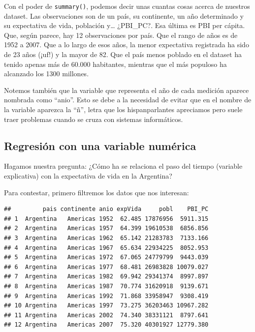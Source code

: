 \documentclass[spanish,]{book}
\newenvironment{Shaded}{\begin{snugshade}}{\end{snugshade}}
\newcommand{\KeywordTok}[1]{\textcolor[rgb]{0.13,0.29,0.53}{\textbf{#1}}}
\newcommand{\NormalTok}[1]{#1}
\newcommand{\OperatorTok}[1]{\textcolor[rgb]{0.81,0.36,0.00}{\textbf{#1}}}
\newcommand{\StringTok}[1]{\textcolor[rgb]{0.31,0.60,0.02}{#1}}
\begin{document}
Con el poder de \texttt{summary()}, podemos decir unas cuantas cosas acerca de nuestros dataset. Las observaciones son de un país, su continente, un año determinado y su expectativa de vida, población y\ldots{} ¿PBI\_PC?. Esa última es PBI per cápita. Que, según parece, hay 12 observaciones por país. Que el rango de años es de 1952 a 2007. Que a lo largo de esos años, la menor expectativa registrada ha sido de 23 años (¡uf!) y la mayor de 82. Que el país menos poblado en el dataset ha tenido apenas más de 60.000 habitantes, mientras que el más populoso ha alcanzado los 1300 millones.

Notemos también que la variable que representa el año de cada medición aparece nombrada como ``anio''. Esto se debe a la necesidad de evitar que en el nombre de la variable aparezca la ``ñ'', letra que los hispanparlantes apreciamos pero suele traer problemas cuando se cruza con sistemas informáticos.

\hypertarget{regresiuxf3n-con-una-variable-numuxe9rica}{%
\subsection{Regresión con una variable numérica}\label{regresiuxf3n-con-una-variable-numuxe9rica}}

Hagamos nuestra pregunta: ¿Cómo ha se relaciona el paso del tiempo (variable explicativa) con la expectativa de vida en la Argentina?

Para contestar, primero filtremos los datos que nos interesan:

\begin{Shaded}
\end{Shaded}

\begin{verbatim}
##         pais continente anio expVida     pobl    PBI_PC
## 1  Argentina   Americas 1952  62.485 17876956  5911.315
## 2  Argentina   Americas 1957  64.399 19610538  6856.856
## 3  Argentina   Americas 1962  65.142 21283783  7133.166
## 4  Argentina   Americas 1967  65.634 22934225  8052.953
## 5  Argentina   Americas 1972  67.065 24779799  9443.039
## 6  Argentina   Americas 1977  68.481 26983828 10079.027
## 7  Argentina   Americas 1982  69.942 29341374  8997.897
## 8  Argentina   Americas 1987  70.774 31620918  9139.671
## 9  Argentina   Americas 1992  71.868 33958947  9308.419
## 10 Argentina   Americas 1997  73.275 36203463 10967.282
## 11 Argentina   Americas 2002  74.340 38331121  8797.641
## 12 Argentina   Americas 2007  75.320 40301927 12779.380
\end{verbatim}
\end{document}
